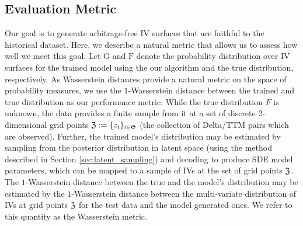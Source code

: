 \documentclass[onefignum,onetabnum]{siamonline190516}
\begin{document}


\subsection{Evaluation Metric}
\label{sec:eval_metric}


Our goal is to generate arbitrage-free IV surfaces that are faithful to the historical dataset. Here, we describe a natural metric that allows us to assess how well we meet this goal. Let $\mathrm{G}$ and $\mathrm{F}$  denote the probability distribution over IV surfaces for the trained model using the our algorithm and the true distribution, respectively. As Wasserstein distances provide a natural metric on the space of probability measures, we use the $1$-Wasserstein distance between the trained and true distribution as our performance metric. While the true distribution $F$ is unknown, the data provides a finite sample from it at a set of discrete 2-dimensional grid points ${\mathfrak{Z}}:=\{z_i\}_{i\in{\mathfrak{G}}}$ (the collection of Delta/TTM pairs which are observed).  Further, the trained model's distribution may be estimated by sampling from the posterior distribution in latent space (using the method described in Section \ref{sec:latent_sampling}) and decoding to produce SDE model parameters, which can be mapped to a sample of IVs at the set of grid points ${\mathfrak{Z}}$. The $1$-Wasserstein distance between the true and the model's distribution may be estimated by the $1$-Wasserstein distance between the multi-variate distribution of IVs at grid points ${\mathfrak{Z}}$ for the test data and the model generated ones. We refer to this quantity as the Wasserstein metric.
\end{document}
